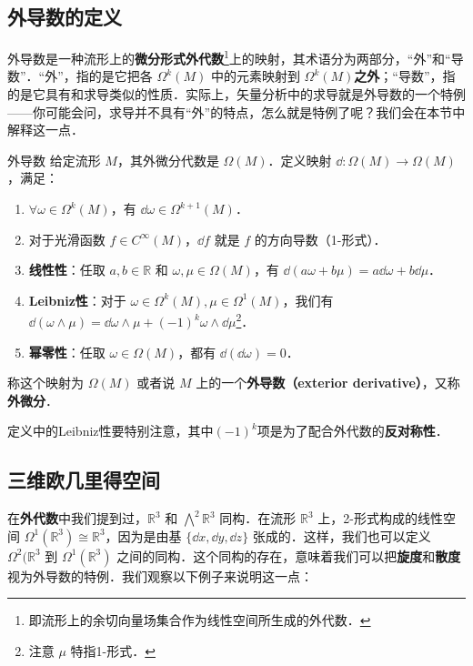 

\subsection{外导数的定义}

外导数是一种流形上的\textbf{微分形式外代数}\footnote{即流形上的余切向量场集合作为线性空间所生成的外代数．}上的映射，其术语分为两部分，“外”和“导数”．“外”，指的是它把各 $\Omega^k(M)$ 中的元素映射到 $\Omega^k(M)$\textbf{之外}；“导数”，指的是它具有和求导类似的性质．实际上，矢量分析中的求导就是外导数的一个特例——你可能会问，求导并不具有“外”的特点，怎么就是特例了呢？我们会在本节中解释这一点．

\begin{definition}{外导数}\label{ExtDer_def1}
给定流形 $M$，其外微分代数是 $\Omega (M)$．定义映射 $\dd:\Omega (M)\rightarrow\Omega (M)$，满足：
\begin{enumerate}
\item $\forall \omega\in\Omega^k(M)$，有 $\dd \omega\in\Omega^{k+1}(M)$．
\item 对于光滑函数 $f\in C^\infty(M)$，$\dd f$ 就是 $f$ 的方向导数（1-形式）．
\item \textbf{线性性}：任取 $a, b\in \mathbb{R}$ 和 $\omega, \mu\in\Omega(M)$，有 $\dd(a\omega+b\mu)=a\dd\omega+b\dd\mu$．
\item \textbf{Leibniz性}：对于 $\omega\in\Omega^k(M), \mu\in\Omega^1(M)$，我们有 $\dd(\omega\wedge\mu)=\dd\omega\wedge\mu+(-1)^k\omega\wedge\dd\mu$\footnote{注意 $\mu$ 特指1-形式．}．
\item \textbf{幂零性}：任取 $\omega\in\Omega(M)$，都有 $\dd(\dd\omega)=0$．
\end{enumerate}
称这个映射为 $\Omega (M)$ 或者说 $M$ 上的一个\textbf{外导数（exterior derivative）}，又称\textbf{外微分}．
\end{definition}

定义中的Leibniz性要特别注意，其中$(-1)^k$项是为了配合外代数的\textbf{反对称性}．



\subsection{三维欧几里得空间}

在\textbf{外代数}中我们提到过，$\mathbb{R}^3$ 和 $\bigwedge^2\mathbb{R}^3$ 同构．在流形 $\mathbb{R}^3$ 上，2-形式构成的线性空间 $\Omega^1(\mathbb{R}^3)\cong\mathbb{R}^3$，因为是由基 $\{\dd x, \dd y, \dd z\}$ 张成的．这样，我们也可以定义 $\Omega^2(\mathbb{R}^3$ 到 $\Omega^1(\mathbb{R}^3)$ 之间的同构．这个同构的存在，意味着我们可以把\textbf{旋度}和\textbf{散度}视为外导数的特例．我们观察以下例子来说明这一点：

